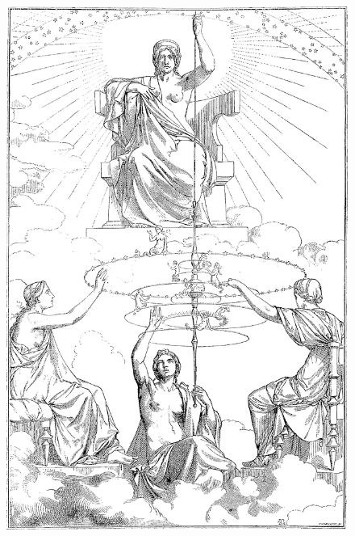 \documentclass[12pt]{article}
\begin{document}
\begin{figure}
\centering
\includegraphics[width=\textwidth,totalheight=\textheight,keepaspectratio]{plato_myth_of_er.png}
\end{figure}
\end{document}
